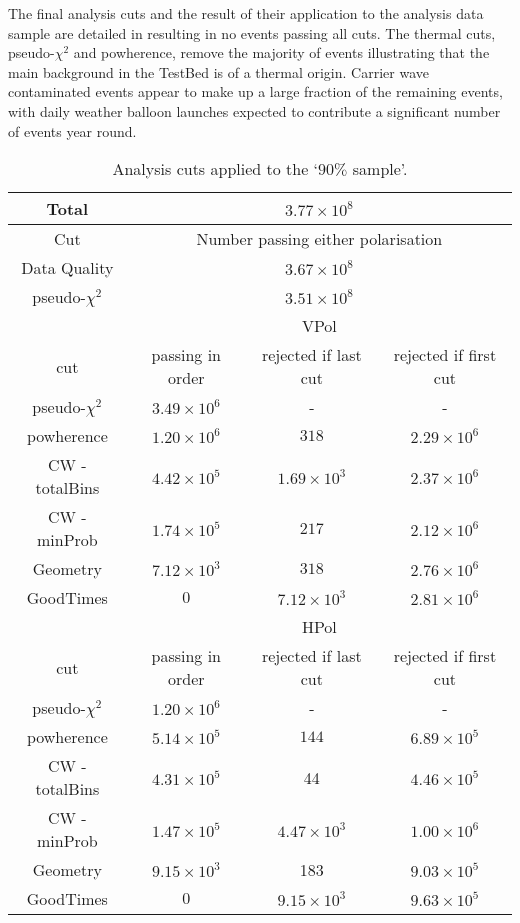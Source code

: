 The final analysis cuts and the result of their application to the analysis data sample are detailed in  resulting in no events passing all cuts. The thermal cuts, pseudo-$\chi^{2}$ and powherence, remove the majority of events illustrating that the main background in the TestBed is of a thermal origin. Carrier wave contaminated events appear to make up a large fraction of the remaining events, with daily weather balloon launches expected to contribute a significant number of events year round. 

\begin{table}
  \begin{center}
    \begin{tabular}{ c || c | c | c }
      Total & \multicolumn{3}{c}{ $3.77 \times 10^{8}$}\\
      \hline
      Cut & \multicolumn{3}{c}{ Number passing either polarisation}\\      
      \hline
      Data Quality & \multicolumn{3}{c}{$3.67 \times 10^8$}\\
      pseudo-$\chi^{2}$ & \multicolumn{3}{c}{$3.51 \times 10^8$}\\
      \hline\hline
      & \multicolumn{3}{c}{VPol}\\
      \hline
      cut & passing in order & rejected if last cut & rejected if first cut \\
      \hline
      pseudo-$\chi^{2}$ & $3.49 \times 10^6$ & - & -\\
      powherence & $1.20 \times 10^6$ & $318$ & $2.29 \times 10^6$\\
      CW - totalBins & $4.42 \times 10^5$ & $1.69 \times 10^3$ & $2.37 \times 10^6$\\
      CW - minProb & $1.74 \times 10^5$ & $217$ & $2.12 \times 10^6$\\
      Geometry & $7.12 \times 10^3$ & $318$ & $2.76 \times 10^6$\\
      GoodTimes & $0$ & $7.12 \times 10^3$ & $2.81 \times 10^6$\\
      \hline\hline
      & \multicolumn{3}{c}{HPol}\\
      \hline
      cut & passing in order & rejected if last cut & rejected if first cut \\
      \hline
      pseudo-$\chi^{2}$ & $1.20 \times 10^6$ & - & -\\
      powherence & $5.14 \times 10^5$ & $144$ & $6.89 \times 10^5$\\
      CW - totalBins & $4.31 \times 10^5$ & 44 & $4.46 \times 10^5$\\
      CW - minProb & $1.47 \times 10^5$ & $4.47 \times 10^3$ & $1.00 \times 10^6$\\
      Geometry & $9.15 \times 10^3$ & 183 & $9.03 \times 10^5$\\
      GoodTimes & $0$ & $9.15 \times 10^3$ & $9.63 \times 10^5$\\      
      \end{tabular} 
    \caption{Analysis cuts applied to the `$90 \%$ sample'.}
    \label{tab:Analysis:Cut-Flow}
  \end{center}
\end{table}

